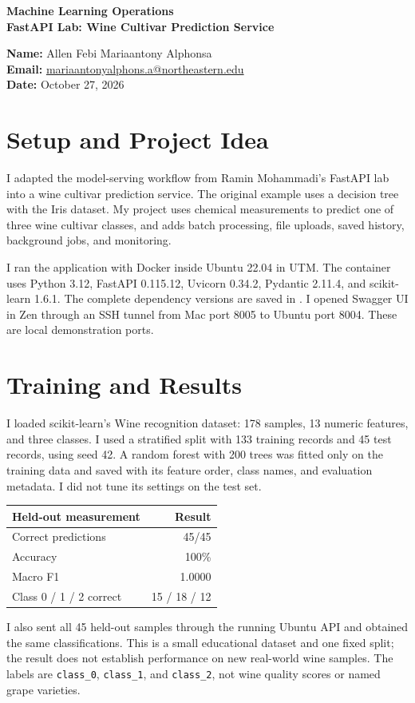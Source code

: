 \documentclass[11pt,letterpaper]{article}
\begin{document}
\begin{center}
{\Large\bfseries Machine Learning Operations}\\[0.3em]
{\large\bfseries FastAPI Lab: Wine Cultivar Prediction Service}
\end{center}
\textbf{Name:} Allen Febi Mariaantony Alphonsa\\
\textbf{Email:} \href{mailto:mariaantonyalphons.a@northeastern.edu}{mariaantonyalphons.a@northeastern.edu}\\
\textbf{Date:} October 27, 2026

\section*{Setup and Project Idea}
I adapted the model-serving workflow from Ramin Mohammadi's FastAPI lab into a wine cultivar prediction service. The original example uses a decision tree with the Iris dataset. My project uses chemical measurements to predict one of three wine cultivar classes, and adds batch processing, file uploads, saved history, background jobs, and monitoring.

I ran the application with Docker inside Ubuntu 22.04 in UTM. The container uses Python 3.12, FastAPI 0.115.12, Uvicorn 0.34.2, Pydantic 2.11.4, and scikit-learn 1.6.1. The complete dependency versions are saved in . I opened Swagger UI in Zen through an SSH tunnel from Mac port 8005 to Ubuntu port 8004. These are local demonstration ports.

\section*{Training and Results}
I loaded scikit-learn's Wine recognition dataset: 178 samples, 13 numeric features, and three classes. I used a stratified split with 133 training records and 45 test records, using seed 42. A random forest with 200 trees was fitted only on the training data and saved with its feature order, class names, and evaluation metadata. I did not tune its settings on the test set.

\begin{center}
\begin{tabular}{lr}
\hline
\textbf{Held-out measurement} & \textbf{Result}\\\hline
Correct predictions & 45/45\\
Accuracy & 100\%\\
Macro F1 & 1.0000\\
Class 0 / 1 / 2 correct & 15 / 18 / 12\\\hline
\end{tabular}
\end{center}
I also sent all 45 held-out samples through the running Ubuntu API and obtained the same classifications. This is a small educational dataset and one fixed split; the result does not establish performance on new real-world wine samples. The labels are \texttt{class\_0}, \texttt{class\_1}, and \texttt{class\_2}, not wine quality scores or named grape varieties.
\end{document}

